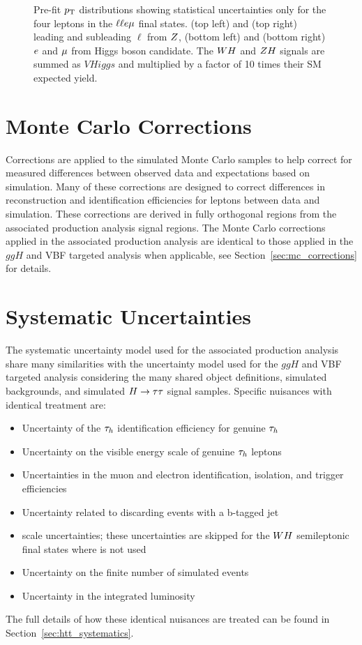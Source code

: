 \begin{figure}[htbp]
     \caption{
Pre-fit $p_\mathrm{T}$ distributions showing statistical uncertainties only for the 
four leptons in the $\ell\ell e\mu$ final states.
(top left) and (top right) leading and subleading $\ell$ from $Z$,
(bottom left) and (bottom right) $e$ and $\mu$ from Higgs boson candidate.
The $WH$ and $ZH$ signals are summed as $VHiggs$ and multiplied by a factor of
10 times their SM expected yield.
     }
     \label{fig:llem_pts}
\end{figure}



\section{Monte Carlo Corrections}
\label{sec:vh_mc_corrections}
Corrections are applied to the simulated Monte Carlo samples to help correct for measured differences
between observed data and expectations based on simulation. Many of these corrections are designed
to correct differences in reconstruction and identification efficiencies for leptons between data
and simulation. These corrections are derived in
fully orthogonal regions from the associated production analysis signal regions.
The Monte Carlo corrections applied in the associated production analysis are identical to those
applied in the $ggH$ and VBF targeted analysis when applicable, see 
Section~\ref{sec:mc_corrections} for details.



\section{Systematic Uncertainties}
\label{sec:vh_systematics}
The systematic uncertainty model used for the associated production analysis share many
similarities with the uncertainty model used for the $ggH$ and VBF targeted analysis
considering the many shared object definitions, simulated backgrounds, and simulated $H\to\tau\tau$
signal samples.
Specific nuisances with identical treatment are:
\begin{itemize}
\item Uncertainty of the $\tau_{h}$ identification efficiency for genuine $\tau_{h}$
\item Uncertainty on the visible energy scale of genuine $\tau_{h}$ leptons
\item Uncertainties in the muon and electron identification, isolation, and trigger efficiencies
\item Uncertainty related to discarding events with a b-tagged jet
\item \etvecmiss scale uncertainties; these uncertainties are skipped for the
$WH$ semileptonic final states where \etvecmiss is not used
\item Uncertainty on the finite number of simulated events
\item Uncertainty in the integrated luminosity
\end{itemize}
The full details of how these identical nuisances are treated can be found in
Section~\ref{sec:htt_systematics}.


